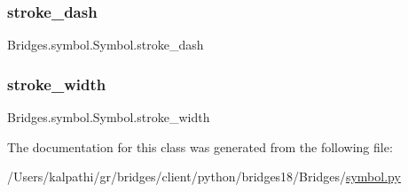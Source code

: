 \subsubsection{\texorpdfstring{stroke\+\_\+dash}{stroke\_dash}}
{\footnotesize\ttfamily Bridges.\+symbol.\+Symbol.\+stroke\+\_\+dash}

\mbox{\label{class_bridges_1_1symbol_1_1_symbol_a44ba84d33800816e0f2696739673190e}} 
\subsubsection{\texorpdfstring{stroke\+\_\+width}{stroke\_width}}
{\footnotesize\ttfamily Bridges.\+symbol.\+Symbol.\+stroke\+\_\+width}



The documentation for this class was generated from the following file\+:\begin{DoxyCompactItemize}
\item 
/\+Users/kalpathi/gr/bridges/client/python/bridges18/\+Bridges/\mbox{\hyperlink{symbol_8py}{symbol.\+py}}\end{DoxyCompactItemize}
